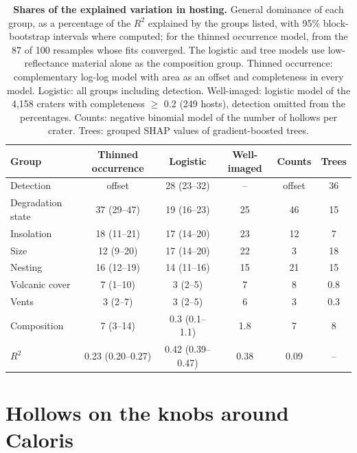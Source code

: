 \documentclass{planetary}
\begin{document}
\begin{table}[!ht]
    \mytablestyle
    \caption{{\bf Shares of the explained variation in hosting.} General dominance of each group, as a percentage of the $R^2$ explained by the groups listed, with 95\% block-bootstrap intervals where computed; for the thinned occurrence model, from the 87 of 100 resamples whose fits converged. The logistic and tree models use low-reflectance material alone as the composition group. Thinned occurrence: complementary log-log model with area as an offset and completeness in every model. Logistic: all groups including detection. Well-imaged: logistic model of the 4,158 craters with completeness $\geq$ 0.2 (249 hosts), detection omitted from the percentages. Counts: negative binomial model of the number of hollows per crater. Trees: grouped SHAP values of gradient-boosted trees.}
    \footnotesize{
        \begin{tabularx}{\textwidth}{>{\raggedright\arraybackslash}X c c c c c}
            \toprule
            \textbf{Group} & \textbf{Thinned occurrence} & \textbf{Logistic} & \textbf{Well-imaged} & \textbf{Counts} & \textbf{Trees} \\
            \hline
            Detection & offset & 28 (23--32) & -- & offset & 36 \\
            Degradation state & 37 (29--47) & 19 (16--23) & 25 & 46 & 15 \\
            Insolation & 18 (11--21) & 17 (14--20) & 23 & 12 & 7 \\
            Size & 12 (9--20) & 17 (14--20) & 22 & 3 & 18 \\
            Nesting & 16 (12--19) & 14 (11--16) & 15 & 21 & 15 \\
            Volcanic cover & 7 (1--10) & 3 (2--5) & 7 & 8 & 0.8 \\
            Vents & 3 (2--7) & 3 (2--5) & 6 & 3 & 0.3 \\
            Composition & 7 (3--14) & 0.3 (0.1--1.1) & 1.8 & 7 & 8 \\
            $R^2$ & 0.23 (0.20--0.27) & 0.42 (0.39--0.47) & 0.38 & 0.09 & -- \\
            \hline
        \end{tabularx}}
    \label{tab:joint}
\end{table}


\clearpage

\section{Hollows on the knobs around Caloris}
\label{sec:knobsS}
\end{document}

